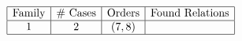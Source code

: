 \begin{table}[h]
	\centering
	$\begin{array}{|c|c|c|c|}
		\hline
		\text{Family} & \text{\# Cases} & \text{Orders} & \text{Found Relations} \\
		\hline
		1 & 2 & (7, 8) &  \\
		\hline
	\end{array}$
\end{table}

